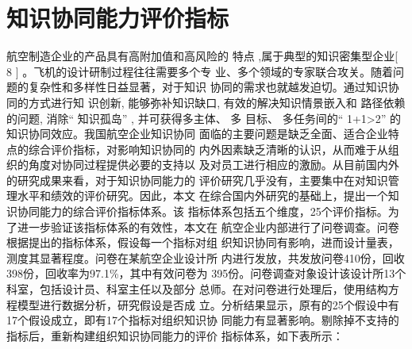 \documentclass[winfonts,UTF8]{ctexart}
\begin{document}
\section{知识协同能力评价指标}
航空制造企业的产品具有高附加值和高风险的
特点 ,属于典型的知识密集型企业[ 8 ] 。飞机的设计研制过程往往需要多个专
业、多个领域的专家联合攻关。随着问题的复杂性和多样性日益显著，对于知识
协同的需求也就越发迫切。通过知识协同的方式进行知
识创新, 能够弥补知识缺口, 有效的解决知识情景嵌入和
路径依赖的问题, 消除“ 知识孤岛” , 并可获得多主体、 多
目标、 多任务间的“ 1+1>2” 的知识协同效应。我国航空企业知识协同
面临的主要问题是缺乏全面、适合企业特点的综合评价指标，对影响知识协同的
内外因素缺乏清晰的认识，从而难于从组织的角度对协同过程提供必要的支持以
及对员工进行相应的激励。从目前国内外的研究成果来看，对于知识协同能力的
评价研究几乎没有，主要集中在对知识管理水平和绩效的评价研究。因此，本文
在综合国内外研究的基础上，提出一个知识协同能力的综合评价指标体系。该
指标体系包括五个维度，25个评价指标。为了进一步验证该指标体系的有效性，本文在
航空企业内部进行了问卷调查。问卷根据提出的指标体系，假设每一个指标对组
织知识协同有影响，进而设计量表，测度其显著程度。问卷在某航空企业设计所
内进行发放，共发放问卷410份，回收398份，回收率为97.1\%，其中有效问卷为
395份。问卷调查对象设计该设计所13个科室，包括设计员、科室主任以及部分
总师。在对问卷进行处理后，使用结构方程模型进行数据分析，研究假设是否成
立。分析结果显示，原有的25个假设中有17个假设成立，即有17个指标对组织知识协
同能力有显著影响。剔除掉不支持的指标后，重新构建组织知识协同能力的评价
指标体系，如下表所示：
\end{document}
